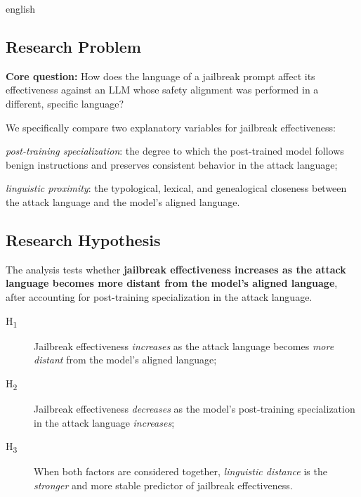 \begin{otherlanguage*}{english}
\subsection{Research Problem}
\textbf{Core question:} How does the language of a jailbreak prompt affect its effectiveness against an LLM whose safety alignment was performed in a different, specific language?

We specifically compare two explanatory variables for jailbreak effectiveness:
\begin{alineas}
    \item \emph{post-training specialization}: the degree to which the post-trained model follows benign instructions and preserves consistent behavior in the attack language;
    \item \emph{linguistic proximity}: the typological, lexical, and genealogical closeness between the attack language and the model’s aligned language.
\end{alineas}

\subsection{Research Hypothesis}
\label{sec:research-hypothesis}

The analysis tests whether \textbf{jailbreak effectiveness increases as the attack language becomes more distant from the model’s aligned language}, after accounting for post-training specialization in the attack language.

\begin{description}
    \item[H\textsubscript{1}] Jailbreak effectiveness \emph{increases} as the attack language becomes \emph{more distant} from the model's aligned language;
    \item[H\textsubscript{2}] Jailbreak effectiveness \emph{decreases} as the model's post-training specialization in the attack language \emph{increases};
    \item[H\textsubscript{3}] When both factors are considered together, \emph{linguistic distance} is the \emph{stronger} and more stable predictor of jailbreak effectiveness.
\end{description}


\end{otherlanguage*}
